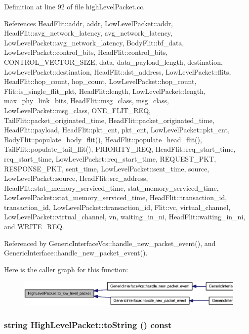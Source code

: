 Definition at line 92 of file highLevelPacket.cc.

References HeadFlit::addr, addr, LowLevelPacket::addr, HeadFlit::avg\_\-network\_\-latency, avg\_\-network\_\-latency, LowLevelPacket::avg\_\-network\_\-latency, BodyFlit::bf\_\-data, LowLevelPacket::control\_\-bits, HeadFlit::control\_\-bits, CONTROL\_\-VECTOR\_\-SIZE, data, data\_\-payload\_\-length, destination, LowLevelPacket::destination, HeadFlit::dst\_\-address, LowLevelPacket::flits, HeadFlit::hop\_\-count, hop\_\-count, LowLevelPacket::hop\_\-count, Flit::is\_\-single\_\-flit\_\-pkt, HeadFlit::length, LowLevelPacket::length, max\_\-phy\_\-link\_\-bits, HeadFlit::msg\_\-class, msg\_\-class, LowLevelPacket::msg\_\-class, ONE\_\-FLIT\_\-REQ, TailFlit::packet\_\-originated\_\-time, HeadFlit::packet\_\-originated\_\-time, HeadFlit::payload, HeadFlit::pkt\_\-cnt, pkt\_\-cnt, LowLevelPacket::pkt\_\-cnt, BodyFlit::populate\_\-body\_\-flit(), HeadFlit::populate\_\-head\_\-flit(), TailFlit::populate\_\-tail\_\-flit(), PRIORITY\_\-REQ, HeadFlit::req\_\-start\_\-time, req\_\-start\_\-time, LowLevelPacket::req\_\-start\_\-time, REQUEST\_\-PKT, RESPONSE\_\-PKT, sent\_\-time, LowLevelPacket::sent\_\-time, source, LowLevelPacket::source, HeadFlit::src\_\-address, HeadFlit::stat\_\-memory\_\-serviced\_\-time, stat\_\-memory\_\-serviced\_\-time, LowLevelPacket::stat\_\-memory\_\-serviced\_\-time, HeadFlit::transaction\_\-id, transaction\_\-id, LowLevelPacket::transaction\_\-id, Flit::vc, virtual\_\-channel, LowLevelPacket::virtual\_\-channel, vn, waiting\_\-in\_\-ni, HeadFlit::waiting\_\-in\_\-ni, and WRITE\_\-REQ.

Referenced by GenericInterfaceVcs::handle\_\-new\_\-packet\_\-event(), and GenericInterface::handle\_\-new\_\-packet\_\-event().

Here is the caller graph for this function:\nopagebreak
\begin{figure}[H]
\begin{center}
\leavevmode
\includegraphics[width=420pt]{classHighLevelPacket_03017f87443d346d08e8ebb4281073c1_icgraph}
\end{center}
\end{figure}
\subsubsection[{toString}]{\setlength{\rightskip}{0pt plus 5cm}string HighLevelPacket::toString () const}\label{classHighLevelPacket_a2292ef0554d515cf08aeed8ca46d419}




